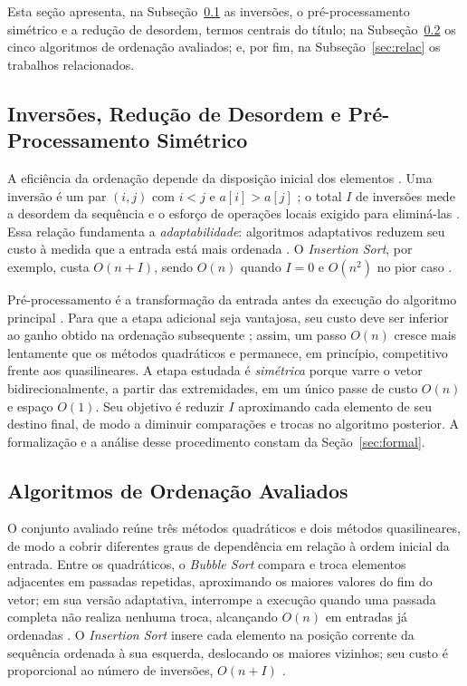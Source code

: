 \documentclass[12pt]{article}
\begin{document}
Esta seção apresenta, na Subseção~\ref{sec:invpre} as inversões, o pré-processamento simétrico e a redução de desordem, termos centrais do título; na Subseção~\ref{sec:algs} os cinco algoritmos de ordenação avaliados; e, por fim, na Subseção~\ref{sec:relac} os trabalhos relacionados.

\subsection{Inversões, Redução de Desordem e Pré-Processamento Simétrico}\label{sec:invpre}

A eficiência da ordenação depende da disposição inicial dos elementos \cite{cormen_introduction_2022, estivill-castro_survey_1992}. Uma inversão é um par $(i,j)$ com $i<j$ e $a[i]>a[j]$ \cite{knuth_art_1973, sedgewick_algorithms_2011}; o total $I$ de inversões mede a desordem da sequência e o esforço de operações locais exigido para eliminá-las \cite{mannila_measures_1984}. Essa relação fundamenta a \emph{adaptabilidade}: algoritmos adaptativos reduzem seu custo à medida que a entrada está mais ordenada \cite{estivill-castro_survey_1992}. O \emph{Insertion Sort}, por exemplo, custa $O(n+I)$, sendo $O(n)$ quando $I=0$ e $O(n^2)$ no pior caso \cite{cormen_introduction_2022, knuth_art_1973}.

Pré-processamento é a transformação da entrada antes da execução do algoritmo principal \cite{cormen_introduction_2022}. Para que a etapa adicional seja vantajosa, seu custo deve ser inferior ao ganho obtido na ordenação subsequente \cite{cormen_introduction_2022, sedgewick_algorithms_2011}; assim, um passo $O(n)$ cresce mais lentamente que os métodos quadráticos e permanece, em princípio, competitivo frente aos quasilineares. A etapa estudada é \emph{simétrica} porque varre o vetor bidirecionalmente, a partir das extremidades, em um único passe de custo $O(n)$ e espaço $O(1)$. Seu objetivo é reduzir $I$ aproximando cada elemento de seu destino final, de modo a diminuir comparações e trocas no algoritmo posterior. A formalização e a análise desse procedimento constam da Seção~\ref{sec:formal}.

\subsection{Algoritmos de Ordenação Avaliados}\label{sec:algs}

O conjunto avaliado reúne três métodos quadráticos e dois métodos quasilineares, de modo a cobrir diferentes graus de dependência em relação à ordem inicial da entrada. Entre os quadráticos, o \emph{Bubble Sort} compara e troca elementos adjacentes em passadas repetidas, aproximando os maiores valores do fim do vetor; em sua versão adaptativa, interrompe a execução quando uma passada completa não realiza nenhuma troca, alcançando $O(n)$ em entradas já ordenadas \cite{cormen_introduction_2022}. O \emph{Insertion Sort} insere cada elemento na posição corrente da sequência ordenada à sua esquerda, deslocando os maiores vizinhos; seu custo é proporcional ao número de inversões, $O(n+I)$ \cite{cormen_introduction_2022, knuth_art_1973}.
\end{document}
